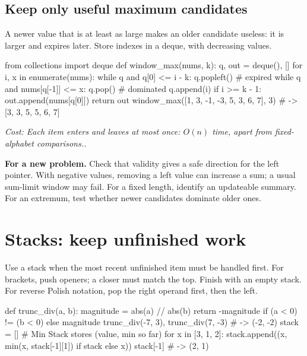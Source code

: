 \documentclass[11pt]{article}
\newcommand{\transfer}[1]{\par\textbf{For a new problem.} #1\par}
\newcommand{\cost}[1]{\par\textit{Cost: #1.}\par}
\begin{document}
\subsection{Keep only useful maximum candidates}
A newer value that is at least as large makes an older candidate useless: it is larger and expires later.
Store indexes in a deque, with decreasing values.
\par\noindent\begin{minipage}{\linewidth}
\hypertarget{example-start-21}{}
\begin{pyex}
from collections import deque
def window_max(nums, k):
    q, out = deque(), []
    for i, x in enumerate(nums):
        while q and q[0] <= i - k:
            q.popleft()              # expired
        while q and nums[q[-1]] <= x:
            q.pop()                  # dominated
        q.append(i)
        if i >= k - 1:
            out.append(nums[q[0]])
    return out
window_max([1, 3, -1, -3, 5, 3, 6, 7], 3) # -> [3, 3, 5, 5, 6, 7]
\end{pyex}
\hypertarget{example-end-21}{}
\end{minipage}\par
\cost{Each item enters and leaves at most once: \(O(n)\) time, apart from fixed-alphabet comparisons.}
\transfer{Check that validity gives a safe direction for the left pointer.
With negative values, removing a left value can increase a sum; a usual sum-limit window may fail.
For a fixed length, identify an updateable summary. For an extremum, test whether newer candidates dominate older ones.}

\section{Stacks: keep unfinished work}\label{sec:stack}
Use a stack when the most recent unfinished item must be handled first.
For brackets, push openers; a closer must match the top. Finish with an empty stack.
For reverse Polish notation, pop the right operand first, then the left.
\par\noindent\begin{minipage}{\linewidth}
\hypertarget{example-start-22}{}
\begin{pyex}
def trunc_div(a, b):
    magnitude = abs(a) // abs(b)
    return -magnitude if (a < 0) != (b < 0) else magnitude
trunc_div(-7, 3), trunc_div(7, -3)    # -> (-2, -2)
stack = []                           # Min Stack stores (value, min so far)
for x in [3, 1, 2]:
    stack.append((x, min(x, stack[-1][1]) if stack else x))
stack[-1]                            # -> (2, 1)
\end{pyex}
\hypertarget{example-end-22}{}
\end{minipage}\par
\end{document}
